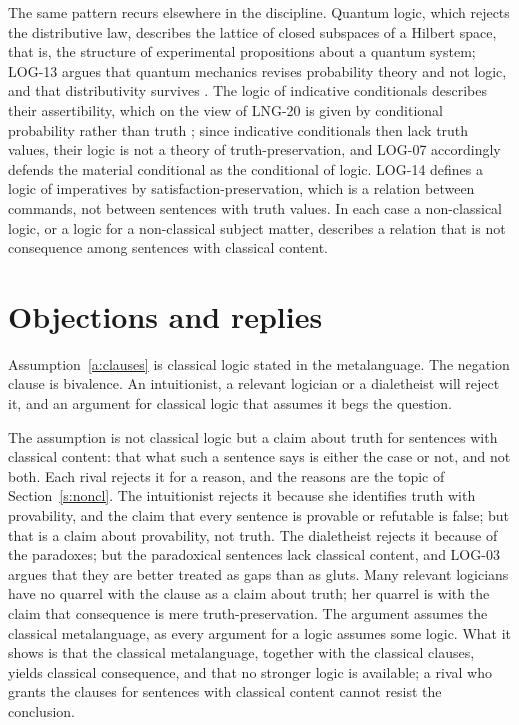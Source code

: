 \documentclass{situationist-preprint}
\begin{document}
The same pattern recurs elsewhere in the discipline. Quantum logic, which rejects the distributive law, describes the lattice of closed subspaces of a Hilbert space, that is, the structure of experimental propositions about a quantum system; LOG-13 argues that quantum mechanics revises probability theory and not logic, and that distributivity survives \citep{Putnam1968}. The logic of indicative conditionals describes their assertibility, which on the view of LNG-20 is given by conditional probability rather than truth \citep{Adams1975}; since indicative conditionals then lack truth values, their logic is not a theory of truth-preservation, and LOG-07 accordingly defends the material conditional as the conditional of logic. LOG-14 defines a logic of imperatives by satisfaction-preservation, which is a relation between commands, not between sentences with truth values. In each case a non-classical logic, or a logic for a non-classical subject matter, describes a relation that is not consequence among sentences with classical content.

\section{Objections and replies}\label{s:obj}

\begin{objection}\label{o:beg}
Assumption~\ref{a:clauses} is classical logic stated in the metalanguage. The negation clause is bivalence. An intuitionist, a relevant logician or a dialetheist will reject it, and an argument for classical logic that assumes it begs the question.
\end{objection}

\begin{reply}
The assumption is not classical logic but a claim about truth for sentences with classical content: that what such a sentence says is either the case or not, and not both. Each rival rejects it for a reason, and the reasons are the topic of Section~\ref{s:noncl}. The intuitionist rejects it because she identifies truth with provability, and the claim that every sentence is provable or refutable is false; but that is a claim about provability, not truth. The dialetheist rejects it because of the paradoxes; but the paradoxical sentences lack classical content, and LOG-03 argues that they are better treated as gaps than as gluts. Many relevant logicians have no quarrel with the clause as a claim about truth; her quarrel is with the claim that consequence is mere truth-preservation. The argument assumes the classical metalanguage, as every argument for a logic assumes some logic. What it shows is that the classical metalanguage, together with the classical clauses, yields classical consequence, and that no stronger logic is available; a rival who grants the clauses for sentences with classical content cannot resist the conclusion.
\end{reply}
\end{document}
